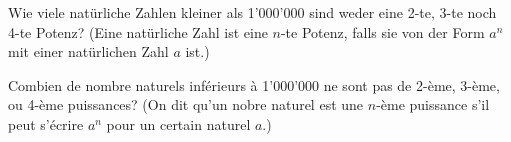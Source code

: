 Wie viele natürliche Zahlen kleiner als 1'000'000 sind weder eine 2-te, 3-te noch 4-te Potenz? (Eine natürliche Zahl ist eine $n$-te Potenz, falls sie von der Form $a^n$ mit einer natürlichen Zahl $a$ ist.)

\bigskip

Combien de nombre naturels inférieurs à 1'000'000 ne sont pas de 2-ème, 3-ème, ou 4-ème puissances? (On dit qu'un nobre naturel est une $n$-ème puissance s'il peut s'écrire $a^n$ pour un certain naturel $a$.)